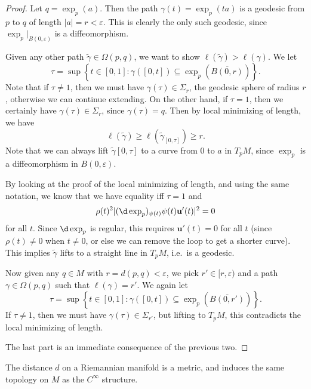 \documentclass[a4paper]{article}
\begin{document}
\begin{proof}
  Let $q = \exp_p(a)$. Then the path $\gamma(t) = \exp_p(ta)$ is a geodesic from $p$ to $q$ of length $|a| = r < \varepsilon$. This is clearly the only such geodesic, since $\exp_p|_{B(0, \varepsilon)}$ is a diffeomorphism.

  Given any other path $\tilde{\gamma} \in \Omega(p, q)$, we want to show $\ell(\tilde{\gamma}) > \ell(\gamma)$. We let
  \[
    \tau = \sup \left\{t \in [0, 1]: \gamma([0, t]) \subseteq \exp_p (\overline{B(0, r)})\right\}.
  \]
  Note that if $\tau \not= 1$, then we must have $\gamma(\tau) \in \Sigma_r$, the geodesic sphere of radius $r$, otherwise we can continue extending. On the other hand, if $\tau = 1$, then we certainly have $\gamma(\tau) \in \Sigma_r$, since $\gamma(\tau) = q$. Then by local minimizing of length, we have
  \[
    \ell(\tilde{\gamma}) \geq \ell(\tilde{\gamma}_{[0, \tau]}) \geq r.
  \]
  Note that we can always lift $\tilde{\gamma}{[0, \tau]}$ to a curve from $0$ to $a$ in $T_p M$, since $\exp_p$ is a diffeomorphism in $B(0, \varepsilon)$.

  By looking at the proof of the local minimizing of length, and using the same notation, we know that we have equality iff $\tau = 1$ and
  \[
    \rho(t)^2 |(\d \exp_p)_{\psi(t)} \psi(t) \mathbf{u}'(t)|^2 = 0
  \]
  for all $t$. Since $\d \exp_p$ is regular, this requires $\mathbf{u}'(t) = 0$ for all $t$ (since $\rho(t) \not= 0$ when $t \not= 0$, or else we can remove the loop to get a shorter curve). This implies $\tilde{\gamma}$ lifts to a straight line in $T_p M$, i.e.\ is a geodesic.

  \separator

  Now given any $q \in M$ with $r = d(p, q) < \varepsilon$, we pick $r' \in [r, \varepsilon)$ and a path $\gamma \in \Omega(p, q)$ such that $\ell(\gamma) = r'$. We again let
  \[
    \tau = \sup \left\{t \in [0, 1]: \gamma([0, t]) \subseteq \exp_p (\overline{B(0, r')})\right\}.
  \]
  If $\tau \not= 1$, then we must have $\gamma(\tau) \in \Sigma_{r'}$, but lifting to $T_pM$, this contradicts the local minimizing of length.

  \separator

  The last part is an immediate consequence of the previous two.
\end{proof}

\begin{cor}
  The distance $d$ on a Riemannian manifold is a metric, and induces the same topology on $M$ as the $C^\infty$ structure.
\end{cor}
\end{document}
